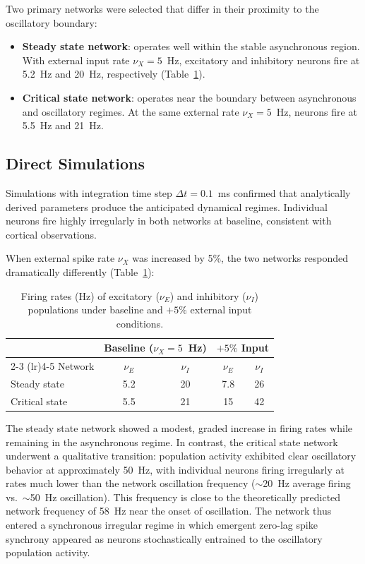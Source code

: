 \documentclass[10pt]{article}
\begin{document}
Two primary networks were selected that differ in their proximity to the oscillatory boundary:

\begin{itemize}
\item \textbf{Steady state network}: operates well within the stable asynchronous region. With external input rate $\nu_X = 5$~Hz, excitatory and inhibitory neurons fire at 5.2~Hz and 20~Hz, respectively (Table~\ref{tab:firing_rates}).
\item \textbf{Critical state network}: operates near the boundary between asynchronous and oscillatory regimes. At the same external rate $\nu_X = 5$~Hz, neurons fire at 5.5~Hz and 21~Hz.
\end{itemize}

\subsection{Direct Simulations}

Simulations with integration time step $\Delta t = 0.1$~ms confirmed that analytically derived parameters produce the anticipated dynamical regimes. Individual neurons fire highly irregularly in both networks at baseline, consistent with cortical observations.

When external spike rate $\nu_X$ was increased by 5\%, the two networks responded dramatically differently (Table~\ref{tab:firing_rates}):

\begin{table}[htbp]
\centering
\caption{Firing rates (Hz) of excitatory ($\nu_E$) and inhibitory ($\nu_I$) populations under baseline and $+5\%$ external input conditions.}
\label{tab:firing_rates}
\begin{tabular}{lcccc}
\toprule
& \multicolumn{2}{c}{Baseline ($\nu_X = 5$~Hz)} & \multicolumn{2}{c}{$+5\%$ Input} \\
\cmidrule(lr){2-3} \cmidrule(lr){4-5}
Network & $\nu_E$ & $\nu_I$ & $\nu_E$ & $\nu_I$ \\
\midrule
Steady state & 5.2 & 20 & 7.8 & 26 \\
Critical state & 5.5 & 21 & 15 & 42 \\
\bottomrule
\end{tabular}
\end{table}

The steady state network showed a modest, graded increase in firing rates while remaining in the asynchronous regime. In contrast, the critical state network underwent a qualitative transition: population activity exhibited clear oscillatory behavior at approximately 50~Hz, with individual neurons firing irregularly at rates much lower than the network oscillation frequency ($\sim$20~Hz average firing vs.\ $\sim$50~Hz oscillation). This frequency is close to the theoretically predicted network frequency of 58~Hz near the onset of oscillation. The network thus entered a synchronous irregular regime in which emergent zero-lag spike synchrony appeared as neurons stochastically entrained to the oscillatory population activity.
\end{document}
